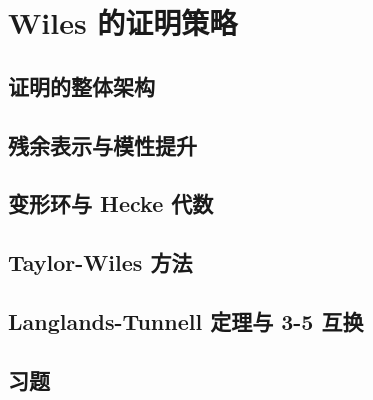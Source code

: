 \chapter{Wiles 的证明策略}
\label{ch:wiles-proof}

\section{证明的整体架构}


\section{残余表示与模性提升}


\section{变形环与 Hecke 代数}


\section{Taylor-Wiles 方法}


\section{Langlands-Tunnell 定理与 3-5 互换}


\section{习题}
